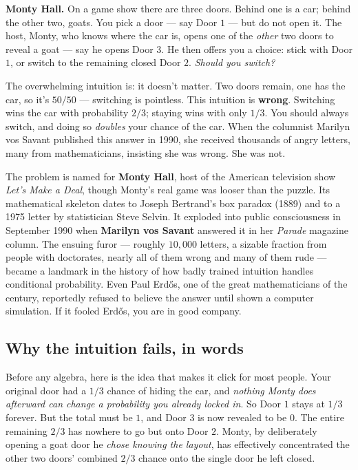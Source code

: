 \begin{paradoxbox}
\textbf{Monty Hall.} On a game show there are three doors. Behind one is a car; behind the
other two, goats. You pick a door --- say Door $1$ --- but do not open it. The host, Monty,
who knows where the car is, opens one of the \emph{other} two doors to reveal a goat ---
say he opens Door $3$. He then offers you a choice: stick with Door $1$, or switch to the
remaining closed Door $2$. \emph{Should you switch?}

The overwhelming intuition is: it doesn't matter. Two doors remain, one has the car, so
it's $50/50$ --- switching is pointless. This intuition is \textbf{wrong}. Switching wins
the car with probability $2/3$; staying wins with only $1/3$. You should always switch,
and doing so \emph{doubles} your chance of the car. When the columnist Marilyn vos Savant
published this answer in 1990, she received thousands of angry letters, many from
mathematicians, insisting she was wrong. She was not.
\end{paradoxbox}

\begin{historybox}
The problem is named for \textbf{Monty Hall}, host of the American television show
\emph{Let's Make a Deal}, though Monty's real game was looser than the puzzle. Its
mathematical skeleton dates to Joseph Bertrand's box paradox (1889) and to a 1975
letter by statistician Steve Selvin. It exploded into public consciousness in September
1990 when \textbf{Marilyn vos Savant} answered it in her \emph{Parade} magazine column.
The ensuing furor --- roughly $10{,}000$ letters, a sizable fraction from people with
doctorates, nearly all of them wrong and many of them rude --- became a landmark in the
history of how badly trained intuition handles conditional probability. Even Paul
Erd\H{o}s, one of the great mathematicians of the century, reportedly refused to believe
the answer until shown a computer simulation. If it fooled Erd\H{o}s, you are in good
company.
\end{historybox}

\subsection{Why the intuition fails, in words}

Before any algebra, here is the idea that makes it click for most people. Your original
door had a $1/3$ chance of hiding the car, and \emph{nothing Monty does afterward can
change a probability you already locked in}. So Door $1$ stays at $1/3$ forever. But the
total must be $1$, and Door $3$ is now revealed to be $0$. The entire remaining $2/3$ has
nowhere to go but onto Door $2$. Monty, by deliberately opening a goat door he \emph{chose
knowing the layout}, has effectively concentrated the other two doors' combined $2/3$
chance onto the single door he left closed.

